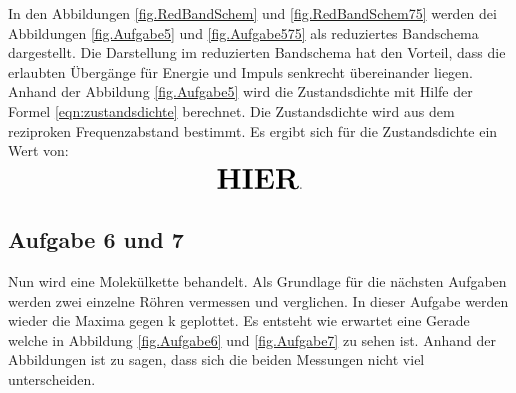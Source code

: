 In den Abbildungen \ref{fig.RedBandSchem} und \ref{fig.RedBandSchem75} werden dei Abbildungen \ref{fig.Aufgabe5} und \ref{fig.Aufgabe575} als reduziertes Bandschema dargestellt.
Die Darstellung im reduzierten Bandschema hat den Vorteil, dass die erlaubten Übergänge für Energie und Impuls senkrecht übereinander liegen.
Anhand der Abbildung \ref{fig.Aufgabe5} wird die Zustandsdichte mit Hilfe der Formel \ref{eqn:zustandsdichte} berechnet.
Die Zustandsdichte wird aus dem reziproken Frequenzabstand bestimmt.
Es ergibt sich für die Zustandsdichte ein Wert von:
\begin{equation*}
  \textbf{\huge{HIER}}.
\end{equation*}

%

\FloatBarrier

\subsection{Aufgabe 6 und 7}
Nun wird eine Molekülkette behandelt.
Als Grundlage für die nächsten Aufgaben werden zwei einzelne Röhren vermessen und verglichen.
In dieser Aufgabe werden wieder die Maxima gegen k geplottet. Es entsteht wie erwartet eine Gerade welche in Abbildung \ref{fig.Aufgabe6} und \ref{fig.Aufgabe7} zu sehen ist.
Anhand der Abbildungen ist zu sagen, dass sich die beiden Messungen nicht viel unterscheiden.


